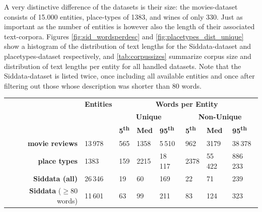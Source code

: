 A very distinctive difference of the datasets is their size: the movies-dataset consists of 15.000 entities, place-types of 1383, and wines of only 330. Just as important as the number of entities is however also the length of their associated text-corpora. Figures \ref{fig:sid_wordsperdesc} and \ref{fig:placetypes_dist_unique} show a histogram of the distribution of text lengths for the Siddata-dataset and placetypes-dataset respectively, and \autoref{tab:corpussizes} summarize corpus size and distribution of text lengths per entity for all handled datasets. Note that the Siddata-dataset is listed twice, once including all available entities and once after filtering out those whose description was shorter than 80 words.

\begin{table}[H]
	\centering
	\begin{tabular}{r|l|lll|lll}
		&  \textbf{Entities}   & \multicolumn{6}{c}{\textbf{Words per Entity}}                                 \\
		&       & \multicolumn{3}{c}{\textbf{Unique}} & \multicolumn{3}{c}{\textbf{Non-Unique}} \\
	 &  & \textbf{5\textsuperscript{th}} & \textbf{Med} & \textbf{95\textsuperscript{th}} & \textbf{5\textsuperscript{th}} & \textbf{Med} & \textbf{95\textsuperscript{th}} \\ \midrule
	\textbf{movie reviews}             & 13\,978 & 565    & 1358 & 5\,510  & 962   & 3179    & 38\,378     \\
	\textbf{place types}               & 1383    & 159    & 2215 & 18\,117 & 2378  & 55\,422 & 886\,233    \\
	\textbf{Siddata (all)}    		   & 26\,346 & 19     & 60     & 169   & 22    & 71      & 239         \\
	\textbf{Siddata} ($\geq 80$ words) & 11\,601 & 63     & 99     & 211   & 83    & 124     & 323         
	\end{tabular}
	\label{tab:corpussizes}
\end{table}

